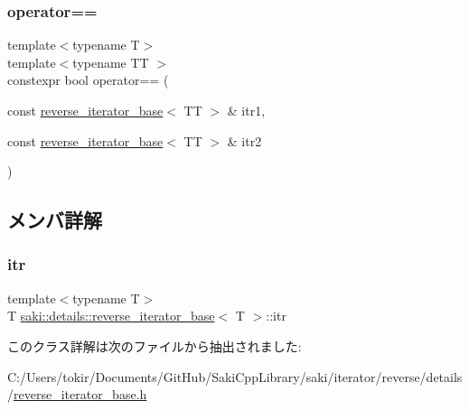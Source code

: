 \subsubsection{\texorpdfstring{operator==}{operator==}}
{\footnotesize\ttfamily template$<$typename T$>$ \\
template$<$typename TT $>$ \\
constexpr bool operator== (\begin{DoxyParamCaption}\item[{const \mbox{\hyperlink{classsaki_1_1details_1_1reverse__iterator__base}{reverse\+\_\+iterator\+\_\+base}}$<$ TT $>$ \&}]{itr1,  }\item[{const \mbox{\hyperlink{classsaki_1_1details_1_1reverse__iterator__base}{reverse\+\_\+iterator\+\_\+base}}$<$ TT $>$ \&}]{itr2 }\end{DoxyParamCaption})\hspace{0.3cm}{\ttfamily [friend]}}



\subsection{メンバ詳解}
\mbox{\label{classsaki_1_1details_1_1reverse__iterator__base_a02df09641bd727c19566dca6c219f279}} 
\subsubsection{\texorpdfstring{itr}{itr}}
{\footnotesize\ttfamily template$<$typename T$>$ \\
T \mbox{\hyperlink{classsaki_1_1details_1_1reverse__iterator__base}{saki\+::details\+::reverse\+\_\+iterator\+\_\+base}}$<$ T $>$\+::itr\hspace{0.3cm}{\ttfamily [protected]}}



このクラス詳解は次のファイルから抽出されました\+:\begin{DoxyCompactItemize}
\item 
C\+:/\+Users/tokir/\+Documents/\+Git\+Hub/\+Saki\+Cpp\+Library/saki/iterator/reverse/details/\mbox{\hyperlink{reverse__iterator__base_8h}{reverse\+\_\+iterator\+\_\+base.\+h}}\end{DoxyCompactItemize}
